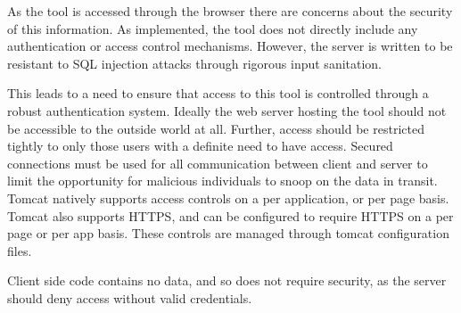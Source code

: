 As the tool is accessed through the browser there are concerns about the security of this information. As implemented, the tool does not directly include any authentication or access control mechanisms. However, the server is written to be resistant to SQL injection attacks through rigorous input sanitation.

This leads to a need to ensure that access to this tool is controlled through a robust authentication system. Ideally the web server hosting the tool should not be accessible to the outside world at all. Further, access should be restricted tightly to only those users with a definite need to have access. Secured connections must be used for all communication between client and server to limit the opportunity for malicious individuals to snoop on the data in transit. Tomcat natively supports access controls on a per application, or per page basis. Tomcat also supports HTTPS, and can be configured to require HTTPS on a per page or per app basis. These controls are managed through tomcat configuration files. 

Client side code contains no data, and so does not require security, as the server should deny access without valid credentials.